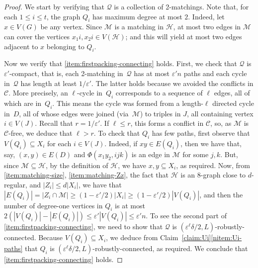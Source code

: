 \documentclass[a4paper, 11pt,reqno]{amsart}
\newcommand{\calH}{\mathcal{H}}
\newcommand{\calQ}{\mathcal{Q}}
\theoremstyle{plain}
\theoremstyle{definition}
\numberwithin{equation}{section}
\newcommand{\eps}{\varepsilon}
\begin{document}
\begin{proof}
We start by verifying that $\calQ$ is a collection of 2-matchings.  Note that, 
for each $1 \leq i \leq t$, the graph $Q_i$ has maximum degree at most $2$.  
Indeed, let $x \in V(G)$ be any vertex.  
Since $\mathcal{M}$ is a matching in $\calH$, at most two edges in $\mathcal{M}$ 
can cover the vertices $x_1 i, x_2 i \in V(\mathcal{H})$; and this 
will yield at most two edges adjacent to $x$ belonging to $Q_i$.

Now we verify that \ref{item:firstpacking-connecting} holds.
First, we check that $\calQ$ is $\eps'$-compact, that is, each 2-matching in~$\calQ$ 
has at most $\eps' n$ paths and each cycle in~$\calQ$ has length at least $1/\eps'$. 
The latter holds because we avoided the conflicts in $\mathcal{C}$.  
More precisely, an $\ell$-cycle in~$Q_i$ corresponds to a sequence of $\ell$ edges, 
all of which are in~$Q_i$.  This means the cycle was formed from a length-$\ell$ 
directed cycle in~$D$, all of whose edges were joined (via~$\mathcal{M}$) to triples 
in $J$, all containing vertex $i \in V(J)$.  Recall that $r = 1/\eps'$.
If $\ell \leq r$, this forms a conflict in $\mathcal{C}$, 
so, as $\mathcal{M}$ is $\mathcal{C}$-free, we deduce that $\ell > r$.
To check that $Q_i$ has few paths, first observe that $V(Q_i) \subseteq X_i$ for each $i \in V(J)$.  
Indeed, if $xy \in E(Q_i)$, then we have that, say, $(x,y) \in E(D)$ and 
$\Phi(x_1 y_2,ijk)$ is an edge in $\mathcal{M}$ for some $j, k$.  
But, since $\mathcal{M} \subseteq \mathcal{H}$, by the definition of $\mathcal{H}$,
we have $x, y \subseteq X_i$, as required.
Now, from \ref{item:matching-size}, \ref{item:matching-Zz}, the fact that 
$\calH$ is an 8-graph close to $d$-regular, and $|Z_i| \leq d|X_i|$, we have that 
$|E(Q_i)| = |Z_i \cap \mathcal{M}| \geq (1 - \eps'/2)|X_i| \geq (1 - \eps'/2)|V(Q_i)|$,
and then the number of degree-one vertices in $Q_i$ is at most 
$2(|V(Q_i)|-|E(Q_i)|) \leq \eps' |V(Q_i)| \leq \eps' n$.
To see the second part of \ref{item:firstpacking-connecting}, 
we need to show that $\mathcal{Q}$ is $(\eps^\ell\delta/2, L)$-robustly-connected.
Because $V(Q_i) \subseteq X_i$, we deduce from Claim~\ref{claim:Ui}\ref{nitem:Ui-paths} 
that $Q_i$ is $(\eps^\ell\delta/2, L)$-robustly-connected, as required.
We conclude that \ref{item:firstpacking-connecting} holds.


\end{proof}
\end{document}
